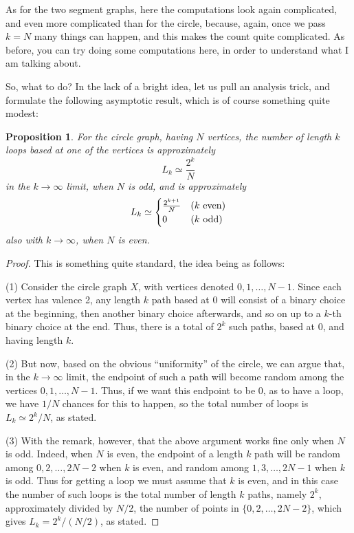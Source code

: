 \documentclass[12pt]{amsbook}
\newtheorem{proposition}[theorem]{Proposition}
\begin{document}
\bigskip

As for the two segment graphs, here the computations look again complicated, and even more complicated than for the circle, because, again, once we pass $k=N$ many things can happen, and this makes the count quite complicated. As before, you can try doing some computations here, in order to understand what I am talking about. 

\bigskip

So, what to do? In the lack of a bright idea, let us pull an analysis trick, and formulate the following asymptotic result, which is of course something quite modest:

\begin{proposition}
For the circle graph, having $N$ vertices, the number of length $k$ loops based at one of the vertices is approximately
$$L_k\simeq\frac{2^k}{N}$$
in the $k\to\infty$ limit, when $N$ is odd, and is approximately
$$L_k\simeq\begin{cases}
\frac{2^{k+1}}{N}&(k\ {\rm even})\\
0&(k\ {\rm odd})
\end{cases}$$
also with $k\to\infty$, when $N$ is even.
\end{proposition}

\begin{proof}
This is something quite standard, the idea being as follows:

\medskip

(1) Consider the circle graph $X$, with vertices denoted $0,1,\ldots,N-1$. Since each vertex has valence 2, any length $k$ path based at 0 will consist of a binary choice at the beginning, then another binary choice afterwards, and so on up to a $k$-th binary choice at the end. Thus, there is a total of $2^k$ such paths, based at 0, and having length $k$. 

\medskip

(2) But now, based on the obvious ``uniformity'' of the circle, we can argue that, in the $k\to\infty$ limit, the endpoint of such a path will become random among the vertices $0,1,\ldots,N-1$. Thus, if we want this endpoint to be 0, as to have a loop, we have $1/N$ chances for this to happen, so the total number of loops is $L_k\simeq 2^k/N$, as stated.

\medskip

(3) With the remark, however, that the above argument works fine only when $N$ is odd. Indeed, when $N$ is even, the endpoint of a length $k$ path will be random among $0,2,\ldots,2N-2$ when $k$ is even, and random among $1,3,\ldots,2N-1$ when $k$ is odd. Thus for getting a loop we must assume that $k$ is even, and in this case the number of such loops is the total number of length $k$ paths, namely $2^k$, approximately divided by $N/2$, the number of points in $\{0,2,\ldots,2N-2\}$, which gives $L_k=2^k/(N/2)$, as stated.
\end{proof}
\end{document}
